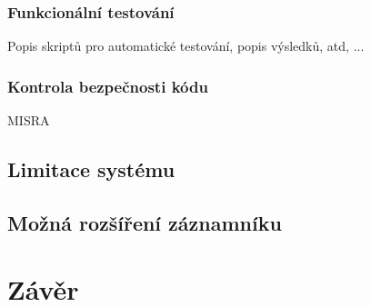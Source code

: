 \subsection{Funkcionální testování}
Popis skriptů pro automatické testování, popis výsledků, atd, ...

\subsection{Kontrola bezpečnosti kódu}
MISRA


\section{Limitace systému}
\label{limitace}


\section{Možná rozšíření záznamníku}
\label{mozne_rozsireni}

\chapter{Závěr}
\label{zaverPrace}



%
